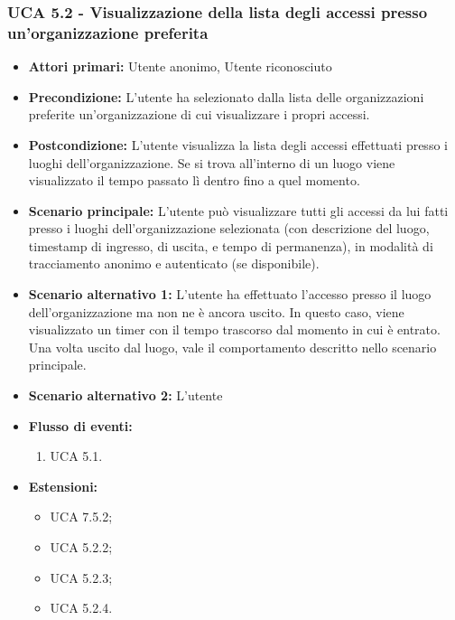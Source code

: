\subsubsection{UCA 5.2 - Visualizzazione della lista degli accessi presso un'organizzazione preferita}
\begin{itemize}
    \item \textbf{Attori primari:} Utente anonimo, Utente riconosciuto
    \item \textbf{Precondizione:} L'utente ha selezionato dalla lista delle organizzazioni preferite un'organizzazione di cui visualizzare i propri accessi.
    \item \textbf{Postcondizione:} L'utente visualizza la lista degli accessi effettuati presso i luoghi dell'organizzazione. Se si trova all'interno di un luogo viene visualizzato il tempo passato lì dentro fino a quel momento.
    \item \textbf{Scenario principale:} L'utente può visualizzare tutti gli accessi da lui fatti presso i luoghi dell'organizzazione selezionata (con descrizione del luogo, timestamp di ingresso, di uscita, e tempo di permanenza), in modalità di tracciamento anonimo e autenticato (se disponibile).
    \item \textbf{Scenario alternativo 1:} L'utente ha effettuato l'accesso presso il luogo dell'organizzazione ma non ne è ancora uscito. In questo caso, viene visualizzato un timer con il tempo trascorso dal momento in cui è entrato.
    Una volta uscito dal luogo, vale il comportamento descritto nello scenario principale.
    \item \textbf{Scenario alternativo 2:} L'utente 
    \item \textbf{Flusso di eventi:}
    \begin{enumerate}
        \item UCA 5.1.
    \end{enumerate}
    \item \textbf{Estensioni:}
    \begin{itemize}
        \item UCA 7.5.2;
        \item UCA 5.2.2;
        \item UCA 5.2.3;
        \item UCA 5.2.4.
    \end{itemize}
\end{itemize}

